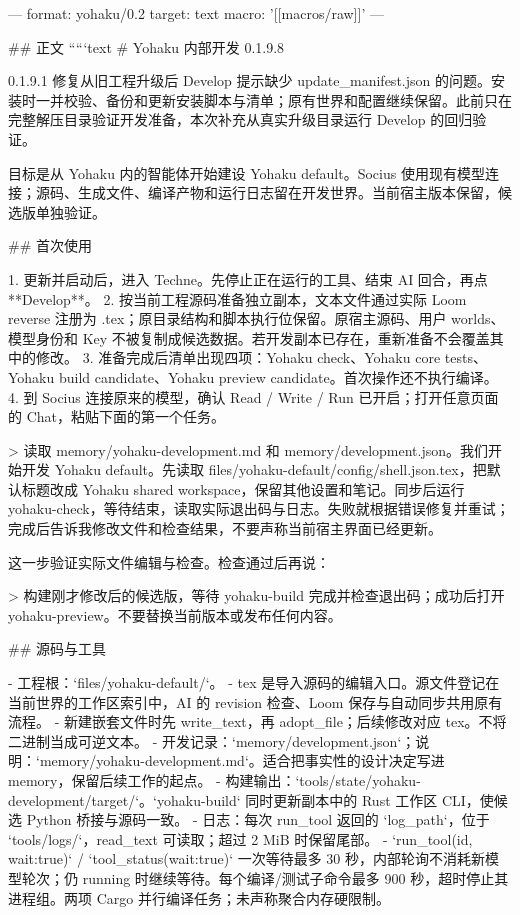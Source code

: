 ---
format: yohaku/0.2
target: text
macro: '[[macros/raw]]'
---

## 正文
`````text
# Yohaku 内部开发 0.1.9.8

0.1.9.1 修复从旧工程升级后 Develop 提示缺少 update_manifest.json 的问题。安装时一并校验、备份和更新安装脚本与清单；原有世界和配置继续保留。此前只在完整解压目录验证开发准备，本次补充从真实升级目录运行 Develop 的回归验证。

目标是从 Yohaku 内的智能体开始建设 Yohaku default。Socius 使用现有模型连接；源码、生成文件、编译产物和运行日志留在开发世界。当前宿主版本保留，候选版单独验证。

## 首次使用

1. 更新并启动后，进入 Techne。先停止正在运行的工具、结束 AI 回合，再点 **Develop**。
2. 按当前工程源码准备独立副本，文本文件通过实际 Loom reverse 注册为 .tex；原目录结构和脚本执行位保留。原宿主源码、用户 worlds、模型身份和 Key 不被复制成候选数据。若开发副本已存在，重新准备不会覆盖其中的修改。
3. 准备完成后清单出现四项：Yohaku check、Yohaku core tests、Yohaku build candidate、Yohaku preview candidate。首次操作还不执行编译。
4. 到 Socius 连接原来的模型，确认 Read / Write / Run 已开启；打开任意页面的 Chat，粘贴下面的第一个任务。

> 读取 memory/yohaku-development.md 和 memory/development.json。我们开始开发 Yohaku default。先读取 files/yohaku-default/config/shell.json.tex，把默认标题改成 Yohaku shared workspace，保留其他设置和笔记。同步后运行 yohaku-check，等待结束，读取实际退出码与日志。失败就根据错误修复并重试；完成后告诉我修改文件和检查结果，不要声称当前宿主界面已经更新。

这一步验证实际文件编辑与检查。检查通过后再说：

> 构建刚才修改后的候选版，等待 yohaku-build 完成并检查退出码；成功后打开 yohaku-preview。不要替换当前版本或发布任何内容。

## 源码与工具

- 工程根：`files/yohaku-default/`。
- tex 是导入源码的编辑入口。源文件登记在当前世界的工作区索引中，AI 的 revision 检查、Loom 保存与自动同步共用原有流程。
- 新建嵌套文件时先 write_text，再 adopt_file；后续修改对应 tex。不将二进制当成可逆文本。
- 开发记录：`memory/development.json`；说明：`memory/yohaku-development.md`。适合把事实性的设计决定写进 memory，保留后续工作的起点。
- 构建输出：`tools/state/yohaku-development/target/`。`yohaku-build` 同时更新副本中的 Rust 工作区 CLI，使候选 Python 桥接与源码一致。
- 日志：每次 run_tool 返回的 `log_path`，位于 `tools/logs/`，read_text 可读取；超过 2 MiB 时保留尾部。
- `run_tool(id, wait:true)` / `tool_status(wait:true)` 一次等待最多 30 秒，内部轮询不消耗新模型轮次；仍 running 时继续等待。每个编译/测试子命令最多 900 秒，超时停止其进程组。两项 Cargo 并行编译任务；未声称聚合内存硬限制。


